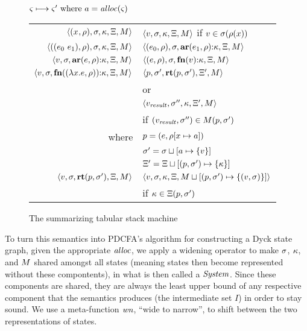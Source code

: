\begin{figure}
  \centering
  $\varsigma \longmapsto \varsigma' \text{ where } a = \mathit{alloc}(\varsigma)$ \\
  \begin{tabular}{r|l}
    \hline
    $\langle (x^{{}}, \rho), \sigma, \kappa, \Xi, M \rangle$
    &
    $\langle v,\sigma,\kappa, \Xi, M \rangle$ if $v \in \sigma(\rho(x))$
    \\
    $\langle ((e_{0}\ e_{1}){}, \rho), \sigma, \kappa, \Xi, M \rangle$
    &
    $\langle (e_{0}, \rho), \sigma, \mathbf{ar}{}(e_{1},\rho){\tt :} \kappa, \Xi, M \rangle$
    \\
    $\langle v, \sigma, \mathbf{ar}{}(e,\rho){\tt :} \kappa, \Xi, M \rangle$
    &
    $\langle (e, \rho), \sigma, \mathbf{fn}{}(v){\tt :} \kappa, \Xi, M \rangle$
    \\
    $\langle v,\sigma,\mathbf{fn}{}((\lambda{} x. e, \rho)){\tt :} \kappa,\Xi,M \rangle$
    & %
    $\langle p,
          \sigma',
          \mathbf{rt}(p, \sigma'),
          \Xi',
          M \rangle$
\\
    & or \\
    & $\langle v_\mathit{result},
            \sigma'',
            \kappa,
            \Xi',
            M \rangle$
    \\ & \quad if $(v_\mathit{result},\sigma'') \in M(p,\sigma')$
    \\ %
    where & $p = (e, \rho[x \mapsto a])$ \\
          & $\sigma' = \sigma\sqcup[a \mapsto \{ v \}]$ \\
          & $\Xi' = \Xi\sqcup[(p, \sigma') \mapsto \{ \kappa \}]$
    \\
    $\langle v, \sigma, \mathbf{rt}(p,\sigma'), \Xi, M \rangle$
    &
    $\langle v, \sigma, \kappa, \Xi, M\sqcup[(p, \sigma') \mapsto \{ (v,\sigma) \}] \rangle$
    \\ & \quad if $\kappa \in \Xi(p, \sigma')$
  \end{tabular}
  \caption{The summarizing tabular stack machine}
  \label{fig:summary-semantics}
\end{figure}

To turn this semantics into PDCFA's algorithm for constructing a Dyck state graph, given the appropriate $\mathit{alloc}$, we apply a widening operator to make $\sigma$, $\kappa$, and $M$ shared amongst all states (meaning states then become represented without these compontents), in what is then called a $\mathit{System}$.
%
Since these components are shared, they are always the least upper bound of any respective component that the semantics produces (the intermediate set $I$) in order to stay sound.
%
We use a meta-function $\mathit{wn}$, ``wide to narrow'', to shift between the two representations of states.

